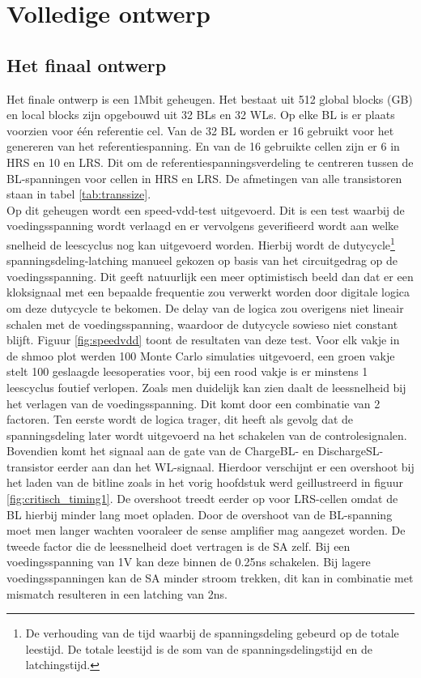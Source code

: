\chapter{Volledige ontwerp}
\label{final}
\section{Het finaal ontwerp}

Het finale ontwerp is een 1Mbit geheugen. Het bestaat uit 512 global blocks (GB) en local blocks zijn opgebouwd uit 32 BLs en 32 WLs. Op elke BL is er plaats voorzien voor één referentie cel. Van de 32 BL worden er 16 gebruikt voor het genereren van het referentiespanning. En van de 16 gebruikte cellen zijn er 6 in HRS en 10 en LRS. Dit om de referentiespanningsverdeling te centreren tussen de BL-spanningen voor cellen in HRS en LRS. De afmetingen van alle transistoren staan in tabel \ref{tab:transsize}. \\
Op dit geheugen wordt een speed-vdd-test uitgevoerd. Dit is een test waarbij de voedingsspanning wordt verlaagd en er vervolgens geverifieerd wordt aan welke snelheid de leescyclus nog kan uitgevoerd worden. Hierbij wordt de dutycycle\footnote{De verhouding van de tijd waarbij de spanningsdeling gebeurd op de totale leestijd. De totale leestijd is de som van de spanningsdelingstijd en de latchingstijd.} spanningsdeling-latching manueel gekozen op basis van het circuitgedrag op de voedingsspanning. Dit geeft natuurlijk een meer optimistisch beeld dan dat er een kloksignaal met een bepaalde frequentie zou verwerkt worden door digitale logica om deze dutycycle te bekomen. De delay van de logica zou overigens niet lineair schalen met de voedingsspanning, waardoor de dutycycle sowieso niet constant blijft. Figuur \ref{fig:speedvdd} toont de resultaten van deze test. Voor elk vakje in de shmoo plot werden 100 Monte Carlo simulaties uitgevoerd, een groen vakje stelt 100 geslaagde leesoperaties voor, bij een rood vakje is er minstens 1 leescyclus foutief verlopen. Zoals men duidelijk kan zien  daalt de leessnelheid bij het verlagen van de voedingsspanning. Dit komt door een combinatie van 2 factoren. Ten eerste wordt de logica trager, dit heeft als gevolg dat de spanningsdeling later wordt uitgevoerd na het schakelen van de controlesignalen. Bovendien komt het signaal aan de gate van de ChargeBL- en DischargeSL-transistor eerder aan dan het WL-signaal. Hierdoor verschijnt er een overshoot bij het laden van de bitline zoals in het vorig hoofdstuk werd geillustreerd in figuur \ref{fig:critisch_timing1}. De overshoot treedt eerder op voor LRS-cellen omdat de BL hierbij minder lang moet opladen. Door de overshoot van de BL-spanning moet men langer wachten vooraleer de sense amplifier mag aangezet worden. De tweede factor die de leessnelheid doet vertragen is de SA zelf. Bij een voedingsspanning van 1V kan deze binnen de 0.25ns schakelen. Bij lagere voedingsspanningen kan de SA minder stroom trekken, dit kan in combinatie met mismatch resulteren in een latching van 2ns.


